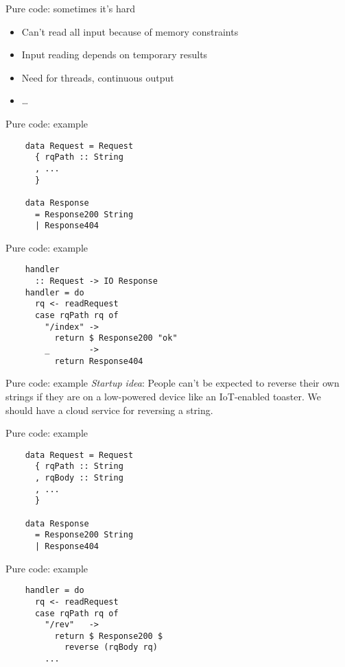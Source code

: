 \documentclass[20pt]{beamer}
\begin{document}
\begin{frame}{Pure code: sometimes it's hard}
    \begin{itemize}
    \item Can't read all input because of memory constraints
    \item Input reading depends on temporary results
    \item Need for threads, continuous output
    \item \ldots
    \end{itemize}
\end{frame}

\begin{frame}[fragile]{Pure code: example}
    \begin{lstlisting}
    data Request = Request
      { rqPath :: String
      , ...
      }

    data Response
      = Response200 String
      | Response404
    \end{lstlisting}
\end{frame}

\begin{frame}[fragile]{Pure code: example}
    \begin{lstlisting}
    handler
      :: Request -> IO Response
    handler = do
      rq <- readRequest
      case rqPath rq of
        "/index" ->
          return $ Response200 "ok"
        _        ->
          return Response404
    \end{lstlisting}
\end{frame}

\begin{frame}{Pure code: example}
    \emph{Startup idea}: People can't be expected to reverse their own strings
    if they are on a low-powered device like an IoT-enabled toaster. We should
    have a cloud service for reversing a string.
\end{frame}

\begin{frame}[fragile]{Pure code: example}
    \begin{lstlisting}
    data Request = Request
      { rqPath :: String
      , rqBody :: String
      , ...
      }

    data Response
      = Response200 String
      | Response404
    \end{lstlisting}
\end{frame}

\begin{frame}[fragile]{Pure code: example}
    \begin{lstlisting}
    handler = do
      rq <- readRequest
      case rqPath rq of
        "/rev"   ->
          return $ Response200 $
            reverse (rqBody rq)
        ...
    \end{lstlisting}
\end{frame}
\end{document}

